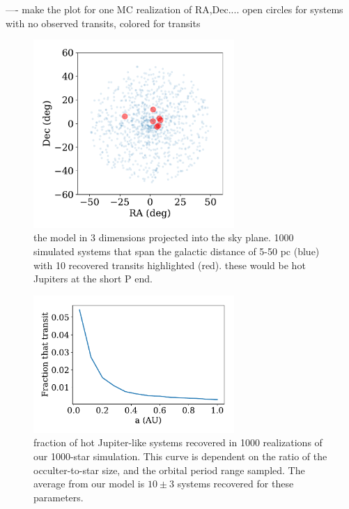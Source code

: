 \documentclass[modern]{aastex62}
\begin{document}
---- make the plot for one MC realization of RA,Dec.... open circles for systems with no observed transits, colored for transits

\begin{figure}[]
\centering
\includegraphics[width=3in]{../figures/3d_model.pdf}
\caption{the model in 3 dimensions projected into the sky plane. 1000 simulated systems that span the galactic distance of 5-50 pc (blue) with 10 recovered transits highlighted (red). these would be hot Jupiters at the short P end.}
\label{fig:3d}
\end{figure}

\begin{figure}[]
\centering
\includegraphics[width=3in]{../figures/recov_fraction.pdf}
\caption{fraction of hot Jupiter-like systems recovered in 1000 realizations of our 1000-star simulation. This curve is dependent on the ratio of the occulter-to-star size, and the orbital period range sampled.
The average from our model is $10\pm 3$ systems recovered for these parameters.}
\label{fig:recov}
\end{figure}
\end{document}
